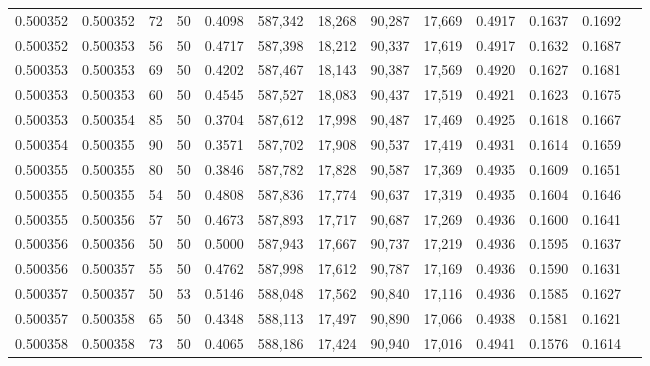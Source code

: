 \begin{tabular}{rrrrrrrrrrrrr}
0.500352 & 0.500352 &    72 &  50 &                                     0.4098 & 587,342 &  18,268 &  90,287 &  17,669 & 0.4917 & 0.1637 & 0.1692 \\
0.500352 & 0.500353 &    56 &  50 &                                     0.4717 & 587,398 &  18,212 &  90,337 &  17,619 & 0.4917 & 0.1632 & 0.1687 \\
0.500353 & 0.500353 &    69 &  50 &                                     0.4202 & 587,467 &  18,143 &  90,387 &  17,569 & 0.4920 & 0.1627 & 0.1681 \\
0.500353 & 0.500353 &    60 &  50 &                                     0.4545 & 587,527 &  18,083 &  90,437 &  17,519 & 0.4921 & 0.1623 & 0.1675 \\
0.500353 & 0.500354 &    85 &  50 &                                     0.3704 & 587,612 &  17,998 &  90,487 &  17,469 & 0.4925 & 0.1618 & 0.1667 \\
0.500354 & 0.500355 &    90 &  50 &                                     0.3571 & 587,702 &  17,908 &  90,537 &  17,419 & 0.4931 & 0.1614 & 0.1659 \\
0.500355 & 0.500355 &    80 &  50 &                                     0.3846 & 587,782 &  17,828 &  90,587 &  17,369 & 0.4935 & 0.1609 & 0.1651 \\
0.500355 & 0.500355 &    54 &  50 &                                     0.4808 & 587,836 &  17,774 &  90,637 &  17,319 & 0.4935 & 0.1604 & 0.1646 \\
0.500355 & 0.500356 &    57 &  50 &                                     0.4673 & 587,893 &  17,717 &  90,687 &  17,269 & 0.4936 & 0.1600 & 0.1641 \\
0.500356 & 0.500356 &    50 &  50 &                                     0.5000 & 587,943 &  17,667 &  90,737 &  17,219 & 0.4936 & 0.1595 & 0.1637 \\
0.500356 & 0.500357 &    55 &  50 &                                     0.4762 & 587,998 &  17,612 &  90,787 &  17,169 & 0.4936 & 0.1590 & 0.1631 \\
0.500357 & 0.500357 &    50 &  53 &                                     0.5146 & 588,048 &  17,562 &  90,840 &  17,116 & 0.4936 & 0.1585 & 0.1627 \\
0.500357 & 0.500358 &    65 &  50 &                                     0.4348 & 588,113 &  17,497 &  90,890 &  17,066 & 0.4938 & 0.1581 & 0.1621 \\
0.500358 & 0.500358 &    73 &  50 &                                     0.4065 & 588,186 &  17,424 &  90,940 &  17,016 & 0.4941 & 0.1576 & 0.1614 \\

\end{tabular}
